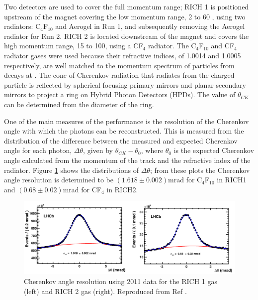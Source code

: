 Two \rich detectors are used to cover the full momentum range; RICH 1 is positioned upstream of the magnet covering the low momentum range, 2 to 60 \gevc, using two radiators: C$_4$F$_{10}$ and Aerogel in Run 1, and subsequently removing the Aerogel radiator for Run 2. RICH 2 is located downstream of the magnet and covers the high momentum range, 15 to 100\gevc, using a CF$_4$ radiator. The C$_4$F$_{10}$ and CF$_4$ radiator gases were used because their refractive indices, of 1.0014 and 1.0005 respectively, are well matched to the momentum spectrum of particles from \B decays at \lhcb. The cone of Cherenkov radiation that radiates from the charged particle is reflected by spherical focusing primary mirrors and planar secondary mirrors to project a ring on Hybrid Photon Detectors (HPDs). The value of $\theta_{CK}$ can be determined from the diameter of the ring.

One of the main measures of the \rich performance is the resolution of the Cherenkov angle with which the photons can be reconstructed. This is measured from the distribution of the difference between the measured and expected Cherenkov angle for each photon, $\Delta\theta$, given by $\theta_{CK} - \theta_0$, where $\theta_0$ is the expected Cherenkov angle calculated from the momentum of the track and the refractive index of the radiator. Figure \ref{cherenkov} shows the distributions of $\Delta\theta$; from these plots the Cherenkov angle resolution is determined to be $(1.618 \pm 0.002)$mrad for C$_4$F$_{10}$ in RICH1 and $(0.68 \pm 0.02)$mrad for CF$_4$ in RICH2.

\begin{figure}
\includegraphics[width=\linewidth]{figures/detector/cherenkov.pdf}
\caption{Cherenkov angle resolution using 2011 data for the RICH 1 gas (left) and RICH 2 gas (right). Reproduced from Ref \cite{LHCb-DP-2012-003}.}
\label{cherenkov}
\end{figure}

